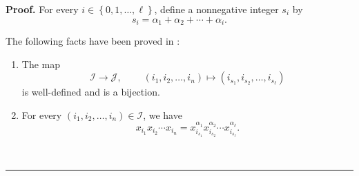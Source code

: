\documentclass[numbers=enddot,12pt,final,onecolumn,notitlepage]{scrartcl}%
\theoremstyle{definition}
\newenvironment{proof}[1][Proof]{\noindent\textbf{#1.} }{\ \rule{0.5em}{0.5em}}
\newenvironment{verlong}{}{}
\begin{document}
\begin{verlong}
\begin{proof}
For every $i\in\left\{  0,1,\ldots,\ell\right\}  $, define a nonnegative
integer $s_{i}$ by
\[
s_{i}=\alpha_{1}+\alpha_{2}+\cdots+\alpha_{i}.
\]


The following facts have been proved in \cite[detailed version, proof of
Proposition 10.69]{Grinbe15}:

\begin{enumerate}
\item The map
\[
\mathcal{I}\rightarrow\mathcal{J},\ \ \ \ \ \ \ \ \ \ \left(  i_{1}%
,i_{2},\ldots,i_{n}\right)  \mapsto\left(  i_{s_{1}},i_{s_{2}},\ldots
,i_{s_{\ell}}\right)
\]
is well-defined and is a bijection.

\item For every $\left(  i_{1},i_{2},\ldots,i_{n}\right)  \in\mathcal{I}$, we
have
\begin{equation}
x_{i_{1}}x_{i_{2}}\cdots x_{i_{n}}=x_{i_{s_{1}}}^{\alpha_{1}}x_{i_{s_{2}}%
}^{\alpha_{2}}\cdots x_{i_{s_{\ell}}}^{\alpha_{\ell}}.
\label{pf.prop.eta.through-x2.long.fact3}%
\end{equation}

\end{enumerate}


\end{proof}
\end{verlong}
\end{document}
